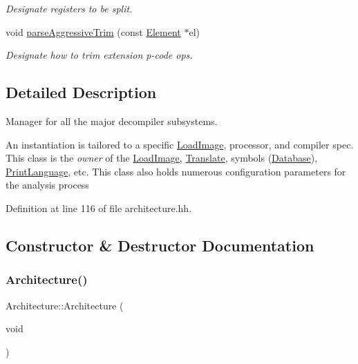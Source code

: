 \begin{DoxyCompactItemize}
\begin{DoxyCompactList}\small\item\em Designate registers to be split. \end{DoxyCompactList}\item 
void \mbox{\hyperlink{class_architecture_a8be334560223db2a9742d8097edf2cf6}{parse\+Aggressive\+Trim}} (const \mbox{\hyperlink{class_element}{Element}} $\ast$el)
\begin{DoxyCompactList}\small\item\em Designate how to trim extension p-\/code ops. \end{DoxyCompactList}\end{DoxyCompactItemize}


\subsection{Detailed Description}
Manager for all the major decompiler subsystems. 

An instantiation is tailored to a specific \mbox{\hyperlink{class_load_image}{Load\+Image}}, processor, and compiler spec. This class is the {\itshape owner} of the \mbox{\hyperlink{class_load_image}{Load\+Image}}, \mbox{\hyperlink{class_translate}{Translate}}, symbols (\mbox{\hyperlink{class_database}{Database}}), \mbox{\hyperlink{class_print_language}{Print\+Language}}, etc. This class also holds numerous configuration parameters for the analysis process 

Definition at line 116 of file architecture.\+hh.



\subsection{Constructor \& Destructor Documentation}
\mbox{\label{class_architecture_aea7049f03a24618ef02d876b0659f67d}} 
\subsubsection{\texorpdfstring{Architecture()}{Architecture()}}
{\footnotesize\ttfamily Architecture\+::\+Architecture (\begin{DoxyParamCaption}\item[{void}]{ }\end{DoxyParamCaption})}




